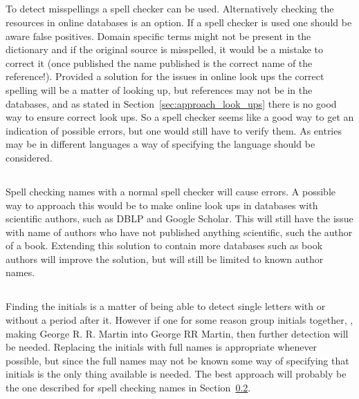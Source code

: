 \subsection{}

To detect misspellings a spell checker can be used.  Alternatively
checking the resources in online databases is an option.  If a spell
checker is used one should be aware false positives.  Domain specific
terms might not be present in the dictionary and if the original
source is misspelled, it would be a mistake to correct it (once
published the name published is the correct name of the reference!).
Provided a solution for the issues in online look ups the correct
spelling will be a matter of looking up, but references may not be in
the databases, and as stated in Section~\ref{sec:approach_look_ups}
there is no good way to ensure correct look ups.  So a spell checker
seems like a good way to get an indication of possible errors, but one
would still have to verify them.  As entries may be in different
languages a way of specifying the language should be considered.


\subsection{}
\label{sec:approach_spelling_names}

Spell checking names with a normal spell checker will cause errors.  A
possible way to approach this would be to make online look ups in
databases with scientific authors, such as DBLP and Google Scholar.
This will still have the issue with name of authors who have not
published anything scientific, such the author of a book.  Extending
this solution to contain more databases such as book authors will
improve the solution, but will still be limited to known author names.


\subsection{}

Finding the initials is a matter of being able to detect single
letters with or without a period after it.  However if one for some
reason group initials together, \eg, making George R. R. Martin into
George RR Martin, then further detection will be needed.  Replacing
the initials with full names is appropriate whenever possible, but
since the full names may not be known some way of specifying that
initials is the only thing available is needed.  The best approach
will probably be the one described for spell checking names in
Section~\ref{sec:approach_spelling_names}.


